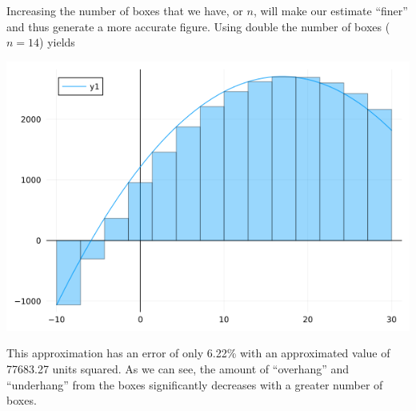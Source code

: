 \documentclass[12pt]{article}
\begin{document}
    Increasing the number of boxes that we have, or $n$, will make our estimate ``finer'' and thus generate a more accurate figure. 
    Using double the number of boxes ($n = 14$) yields
    \begin{center}
        \includegraphics[scale=0.45]{images/LRAM_2.png}
    \end{center}
    This approximation has an error of only 6.22\% with an approximated value of 77683.27 units squared. As we can see, the amount of ``overhang'' and ``underhang'' from the boxes 
    significantly decreases with a greater number of boxes.
\end{document}
